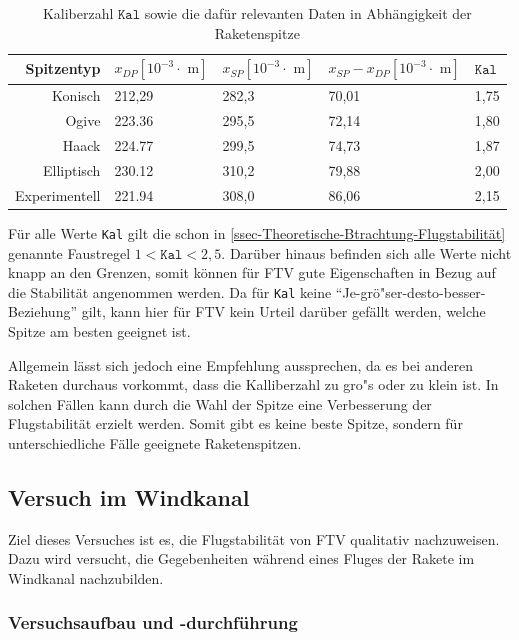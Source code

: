 \documentclass[10pt,a4paper]{article}
\begin{document}
\begin{table}[H]
	\caption{Kaliberzahl $\mathtt{Kal}$ sowie die dafür relevanten Daten in Abhängigkeit der Raketenspitze}
	\label{tab-Kaliberzahlen}
	\centering
	\begin{tabular}{r|lll|l}
		\toprule
		Spitzentyp	& $x_{DP} [10^{-3} \cdot \text{ m}]$ & $x_{SP} [10^{-3} \cdot \text{ m}]$ & $x_{SP} - x_{DP} [10^{-3} \cdot \text{ m}]$ & $\mathtt{Kal}$ \\
		\midrule
		Konisch			& 212,29  & 282,3  & 70,01 &  1,75 \\
		Ogive			& 223.36  & 295,5  & 72,14 &  1,80 \\
		Haack			& 224.77  & 299,5  & 74,73 &  1,87 \\
		Elliptisch		& 230.12  & 310,2  & 79,88 &  2,00 \\
		Experimentell	& 221.94  & 308,0  & 86,06 &  2,15 \\
		\bottomrule
	\end{tabular}
\end{table}

\noindent
Für alle Werte \texttt{Kal} gilt die schon in \ref{ssec-Theoretische-Btrachtung-Flugstabilität} genannte Faustregel $1 < \mathtt{Kal} < 2,5$. Darüber hinaus befinden sich alle Werte nicht knapp an den Grenzen, somit können für FTV gute Eigenschaften in Bezug auf die Stabilität angenommen werden. Da für \texttt{Kal} keine "`Je-grö"ser-desto-besser-Beziehung"' gilt, kann hier für FTV kein Urteil darüber gefällt werden, welche Spitze am besten geeignet ist.

Allgemein lässt sich jedoch eine Empfehlung aussprechen, da es bei anderen Raketen durchaus vorkommt, dass die Kalliberzahl zu gro"s oder zu klein ist. In solchen Fällen kann durch die Wahl der Spitze eine Verbesserung der Flugstabilität erzielt werden. Somit gibt es keine beste Spitze, sondern für unterschiedliche Fälle geeignete Raketenspitzen. 


\subsection{Versuch im Windkanal}

Ziel dieses Versuches ist es, die Flugstabilität von FTV qualitativ nachzuweisen. Dazu wird versucht, die Gegebenheiten während eines Fluges der Rakete im Windkanal nachzubilden. 


\subsubsection{Versuchsaufbau und -durchführung}
\end{document}
